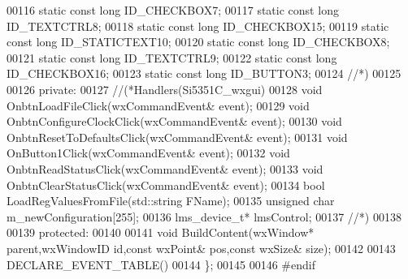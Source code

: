 \begin{DoxyCode}
00116     \textcolor{keyword}{static} \textcolor{keyword}{const} \textcolor{keywordtype}{long} ID_CHECKBOX7;
00117     \textcolor{keyword}{static} \textcolor{keyword}{const} \textcolor{keywordtype}{long} ID_TEXTCTRL8;
00118     \textcolor{keyword}{static} \textcolor{keyword}{const} \textcolor{keywordtype}{long} ID_CHECKBOX15;
00119     \textcolor{keyword}{static} \textcolor{keyword}{const} \textcolor{keywordtype}{long} ID_STATICTEXT10;
00120     \textcolor{keyword}{static} \textcolor{keyword}{const} \textcolor{keywordtype}{long} ID_CHECKBOX8;
00121     \textcolor{keyword}{static} \textcolor{keyword}{const} \textcolor{keywordtype}{long} ID_TEXTCTRL9;
00122     \textcolor{keyword}{static} \textcolor{keyword}{const} \textcolor{keywordtype}{long} ID_CHECKBOX16;
00123     \textcolor{keyword}{static} \textcolor{keyword}{const} \textcolor{keywordtype}{long} ID_BUTTON3;
00124     \textcolor{comment}{//*)}
00125 
00126 \textcolor{keyword}{private}:
00127     \textcolor{comment}{//(*Handlers(Si5351C\_wxgui)}
00128     \textcolor{keywordtype}{void} OnbtnLoadFileClick(wxCommandEvent& event);
00129     \textcolor{keywordtype}{void} OnbtnConfigureClockClick(wxCommandEvent& event);
00130     \textcolor{keywordtype}{void} OnbtnResetToDefaultsClick(wxCommandEvent& event);
00131     \textcolor{keywordtype}{void} OnButton1Click(wxCommandEvent& event);
00132     \textcolor{keywordtype}{void} OnbtnReadStatusClick(wxCommandEvent& event);
00133     \textcolor{keywordtype}{void} OnbtnClearStatusClick(wxCommandEvent& event);
00134     \textcolor{keywordtype}{bool} LoadRegValuesFromFile(std::string FName);
00135     \textcolor{keywordtype}{unsigned} \textcolor{keywordtype}{char} m_newConfiguration[255];
00136     lms_device_t* lmsControl;
00137     \textcolor{comment}{//*)}
00138 
00139 \textcolor{keyword}{protected}:
00140 
00141     \textcolor{keywordtype}{void} BuildContent(wxWindow* parent,wxWindowID \textcolor{keywordtype}{id},\textcolor{keyword}{const} wxPoint& pos,\textcolor{keyword}{const} wxSize& 
      size);
00142 
00143     DECLARE\_EVENT\_TABLE()
00144 \};
00145 
00146 \textcolor{preprocessor}{#endif}
\end{DoxyCode}
